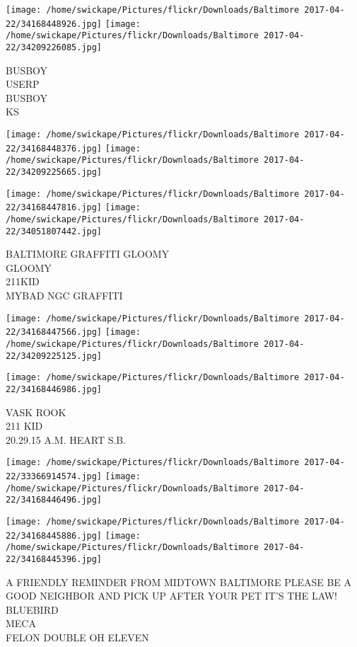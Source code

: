 \documentclass[10pt,letterpaper]{article}
\begin{document}
\texttt{[image: /home/swickape/Pictures/flickr/Downloads/Baltimore 2017-04-22/34168448926.jpg]}
\texttt{[image: /home/swickape/Pictures/flickr/Downloads/Baltimore 2017-04-22/34209226085.jpg]}

BUSBOY\\
USERP\\
BUSBOY\\
KS
\pagebreak

\texttt{[image: /home/swickape/Pictures/flickr/Downloads/Baltimore 2017-04-22/34168448376.jpg]}
\texttt{[image: /home/swickape/Pictures/flickr/Downloads/Baltimore 2017-04-22/34209225665.jpg]}

\texttt{[image: /home/swickape/Pictures/flickr/Downloads/Baltimore 2017-04-22/34168447816.jpg]}
\texttt{[image: /home/swickape/Pictures/flickr/Downloads/Baltimore 2017-04-22/34051807442.jpg]}

BALTIMORE GRAFFITI GLOOMY\\
GLOOMY\\
211KID\\
MYBAD NGC GRAFFITI
\pagebreak

\texttt{[image: /home/swickape/Pictures/flickr/Downloads/Baltimore 2017-04-22/34168447566.jpg]}
\texttt{[image: /home/swickape/Pictures/flickr/Downloads/Baltimore 2017-04-22/34209225125.jpg]}

\vspace{0.25in}
\texttt{[image: /home/swickape/Pictures/flickr/Downloads/Baltimore 2017-04-22/34168446986.jpg]}

VASK ROOK\\
211 KID\\
20.29.15 A.M. HEART S.B.
\pagebreak

\texttt{[image: /home/swickape/Pictures/flickr/Downloads/Baltimore 2017-04-22/33366914574.jpg]}
\texttt{[image: /home/swickape/Pictures/flickr/Downloads/Baltimore 2017-04-22/34168446496.jpg]}

\texttt{[image: /home/swickape/Pictures/flickr/Downloads/Baltimore 2017-04-22/34168445886.jpg]}
\texttt{[image: /home/swickape/Pictures/flickr/Downloads/Baltimore 2017-04-22/34168445396.jpg]}

A FRIENDLY REMINDER FROM MIDTOWN BALTIMORE PLEASE BE A GOOD NEIGHBOR AND PICK UP AFTER YOUR PET IT'S THE LAW!\\
BLUEBIRD\\
MECA\\
FELON DOUBLE OH ELEVEN
\pagebreak
\end{document}
